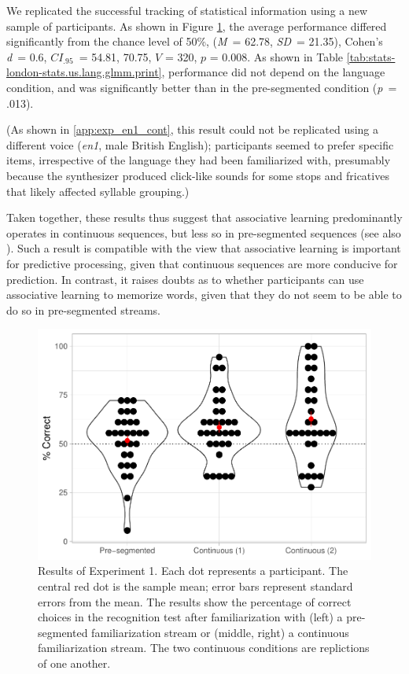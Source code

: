 \documentclass[]{article}
\newcommand{\p}{{\em p\/}}
\newcommand{\M}{{\em M\/}}
\newcommand{\SD}{{\em SD\/}}
\newcommand{\D}{Cohen's {\em d\/}}
\newcommand{\CI}{$CI_{.95}$}
\begin{document}
We replicated the successful tracking of statistical information using a new sample of participants. As shown in Figure \ref{fig:stats-london-stats.3x.us.segm.cont.plot}, the average performance differed significantly from the chance level of 50\%, (\M~= 62.78, \SD~= 21.35), \D~= 0.6, \CI~= 54.81, 70.75, \(V\) = 320, \(p\) = 0.008. As shown in Table \ref{tab:stats-london-stats.us.lang.glmm.print}, performance did not depend on the language condition, and was significantly better than in the pre-segmented condition (\p~= .013).

(As shown in \ref{app:exp_en1_cont}, this result could not be replicated using a different voice (\emph{en1}, male British English); participants seemed to prefer specific items, irrespective of the language they had been familiarized with, presumably because the synthesizer produced click-like sounds for some stops and fricatives that likely affected syllable grouping.)

Taken together, these results thus suggest that associative learning predominantly operates in continuous sequences, but less so in pre-segmented sequences (see also \citealp{Shukla2007}). Such a result is compatible with the view that associative learning is important for predictive processing, given that continuous sequences are more conducive for prediction. In contrast, it raises doubts as to whether participants can use associative learning to memorize words, given that they do not seem to be able to do so in pre-segmented streams.

\begin{figure}

{\centering \includegraphics[width=0.8\linewidth]{segmentation_recall_combined_files/figure-latex/stats-london-stats.3x.us.segm.cont.plot-1} 

}

\caption{Results of Experiment 1. Each dot represents a participant. The central red dot is the sample mean; error bars represent standard errors from the mean. The results show the percentage of correct choices in the recognition test after familiarization with (left) a pre-segmented familiarization stream or (middle, right) a continuous familiarization stream. The two continuous conditions are replictions of one another.}\label{fig:stats-london-stats.3x.us.segm.cont.plot}
\end{figure}
\end{document}

